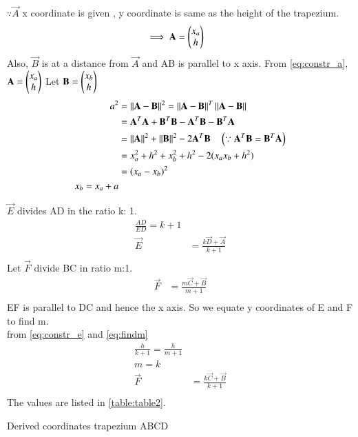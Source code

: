 \begin{enumerate}[label=\thesection.\arabic*.,ref=\thesection.\theenumi]
$\because \vec{A}$ x coordinate is given , y coordinate is same as the height of the trapezium.  
\begin{align}
\implies \mathbf{A} &= \begin{pmatrix}x_a\\h\end{pmatrix}
\label{eq:constr_a}
\end{align}
%
Also, $\vec{B}$ is at a distance from $\vec {A}$ and AB is parallel to x axis. 
\newline
From \eqref{eq:constr_a},$\mathbf{A} = \begin{pmatrix}x_a\\h\end{pmatrix}$ 
Let $\mathbf{B} = \begin{pmatrix}x_b\\h\end{pmatrix}$
\begin{align}
a^2 &=\left\lVert\mathbf{A}-\mathbf{B}\right\rVert^2 = \left\lVert\mathbf{A}-\mathbf{B}\right\rVert^T\left\lVert\mathbf{A}-\mathbf{B}\right\rVert  
\\
&= \mathbf{A}^T\mathbf{A}+\mathbf{B}^T\mathbf{B}-\mathbf{A}^T\mathbf{B} - \mathbf{B}^T\mathbf{A} 
\\
&= \left\lVert\mathbf{A}\right\rVert^2 + \left\lVert\mathbf{B}\right\rVert^2 - 2\mathbf{A}^T\mathbf{B} \quad \left(\because \mathbf{A}^T\mathbf{B} = \mathbf{B}^T\mathbf{A} \right) 
\label{eq:tri_const_norm_ac}
\\
&= x_a^2+h^2+x_b^2+h^2-2(x_a x_b + h^2)
\\
&= \left(x_a-x_b\right)^2
\\
x_b = x_a + a
\\
\label{eq:constr_b}
\end{align}

$\vec{E}$ divides AD in the ratio k: 1. 
\begin{align}
\frac{AD}{ED} = k+1 
\\
\vec{E} &= \frac{{{k\vec{D}} +\vec{A}}}{k+1}
\\
\label{eq:constr_e}
\end{align}
%
Let $\vec{F}$ divide BC in ratio m:1.
\begin{align}
\vec{F} &= \frac{{{m\vec{C}} +\vec{B}}}{m+1}
\\
\label{eq:findm}
\end{align}
EF is parallel to DC and hence the x axis. So we equate y coordinates of E and F to find m.
\\
from \ref{eq:constr_e} and \ref{eq:findm}
\begin{align}
\frac{h}{k+1} = \frac{h}{m+1}
\\
 m = k 
\\
\vec{F} &= \frac{{k\vec{C} +\vec{B}}}{k+1}
\\
\label{eq:constr_f}
\end{align}
%
The values are listed in \ref{table:table2}. 
%
\begin{table}[ht!]
\centering

\caption{Derived coordinates trapezium ABCD}
\label{table:table2}	
\end{table}
 

\end{enumerate}
